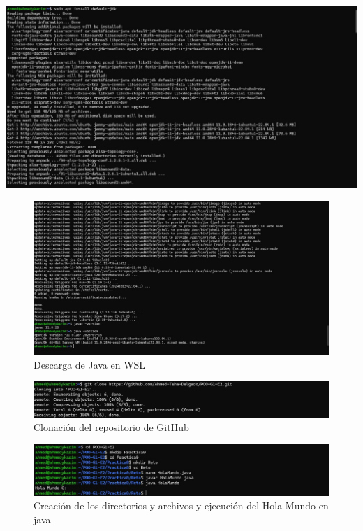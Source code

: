 \documentclass[letterpaper,12pt]{article}
\begin{document}
\begin{center}
    \includegraphics[width=14cm]{descarga1.jpeg}
\end{center}

\begin{figure}[H]
    \centering
    \includegraphics[width=14cm]{descarga2.jpg}
    \caption{Descarga de Java en WSL}
    \label{fig:java}
\end{figure}

\begin{figure}[H]
    \centering
    \includegraphics[width=14cm]{clonar.jpeg}
    \caption{Clonación del repositorio de GitHub}
    \label{fig:java}
\end{figure}

\begin{figure}[H]
    \centering
    \includegraphics[width=14cm]{creacion.jpeg}
    \caption{Creación de los directorios y archivos y ejecución del Hola Mundo en java}
    \label{fig:java}
\end{figure}
\end{document}
